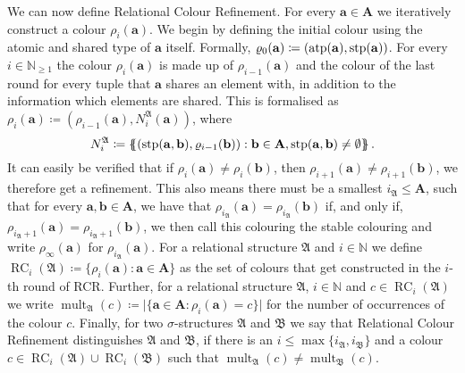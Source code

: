 We can now define Relational Colour Refinement.
For every $\mathbf a\in \mathbf A$ we iteratively construct a colour $\rho_i(\mathbf a)$.
We begin by defining the initial colour using the atomic and shared type of $\mathbf a$ itself.
Formally, $\varrho_0(\mathbf a)\coloneqq(\operatorname{atp}(\mathbf a), \operatorname{stp}(\mathbf a))$.
For every $i \in \mathbb N_{\geq 1}$ the colour $\rho_i(\mathbf a)$ is made up of $\rho_{i-1}(\mathbf a)$ and the colour of the last round for every tuple that $\mathbf a$ shares an element with, in addition to the information which elements are shared.
This is formalised as $\rho_i(\mathbf a)\coloneqq(\rho_{i-1}(\mathbf a), N_i^{\mathfrak A}(\mathbf a))$, where
$$N_i^{\mathfrak A}\coloneqq \left\{\kern-.35em\left\{(\operatorname{stp}(\mathbf a, \mathbf b), \varrho_{i-1}(\mathbf b)) : \mathbf b\in \mathbf A, \operatorname{stp}(\mathbf a, \mathbf b)\neq \emptyset\right\}\kern-.35em\right\}.$$
It can easily be verified that if $\rho_i(\mathbf a) \neq \rho_i(\mathbf b)$, then $\rho_{i+1}(\mathbf a)\neq\rho_{i+1}(\mathbf b)$, we therefore get a refinement.
This also means there must be a smallest $i_{\mathfrak A} \leq \mathbf A$, such that for every $\mathbf a, \mathbf b\in \mathbf A$, we have that $\rho_{i_{\mathfrak A}}(\mathbf a) = \rho_{i_{\mathfrak A}}(\mathbf b)$ if, and only if, $\rho_{i_{\mathfrak A}+1}(\mathbf a) = \rho_{i_{\mathfrak A}+1}(\mathbf b)$, we then call this colouring the stable colouring and write $\rho_\infty(\mathbf a)$ for $\rho_{i_{\mathfrak A}}(\mathbf a)$.
For a relational structure $\mathfrak A$ and $i\in \mathbb N$ we define $\operatorname{RC}_i(\mathfrak A)\coloneqq\{\rho_i(\mathbf a) : \mathbf a \in \mathbf A\}$ as the set of colours that get constructed in the $i$-th round of RCR.
Further, for a relational structure $\mathfrak A$, $i\in \mathbb N$ and $c\in \operatorname{RC}_i(\mathfrak A)$ we write $\operatorname{mult}_{\mathfrak A}(c)\coloneqq \vert \{\mathbf a\in \mathbf A : \rho_i(\mathbf a)=c\}\vert$ for the number of occurrences of the colour $c$.
Finally, for two $\sigma$-structures $\mathfrak A$ and $\mathfrak B$ we say that Relational Colour Refinement distinguishes $\mathfrak A$ and $\mathfrak B$, if there is an $i \leq \max\{i_{\mathfrak A}, i_{\mathfrak B}\}$ and a colour $c\in \operatorname{RC}_i(\mathfrak A) \cup \operatorname{RC}_i(\mathfrak B)$ such that $\operatorname{mult}_{\mathfrak A}(c)\neq \operatorname{mult}_{\mathfrak B}(c)$.

